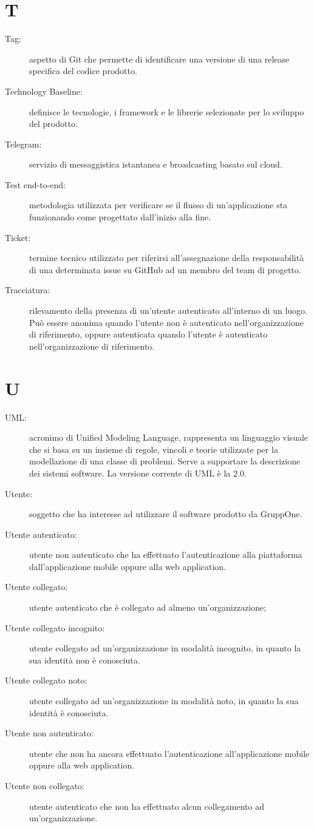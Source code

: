 \documentclass{article}
\begin{document}
\section{T}
\begin{description}
  \item[Tag:] aspetto di Git che permette di identificare una versione di una release specifica del codice prodotto.
  \item[Technology Baseline:] definisce le tecnologie, i framework e le librerie selezionate per lo sviluppo del prodotto.
  \item[Telegram:] servizio di messaggistica istantanea e broadcasting basato sul cloud.
  \item[Test end-to-end:] metodologia utilizzata per verificare se il flusso di un'applicazione sta funzionando come progettato dall'inizio alla fine.
  \item[Ticket:] termine tecnico utilizzato per riferirsi all'assegnazione della responsabilità di una determinata issue su GitHub ad un membro del team di progetto.
  \item[Tracciatura:] rilevamento della presenza di un'utente autenticato all'interno di un luogo. Può essere anonima quando l'utente non è autenticato nell'organizzazione di riferimento, oppure autenticata quando l'utente è autenticato nell'organizzazione di riferimento.
\end{description}
\newpage
\section{U}
\begin{description}
  \item[UML:] acronimo di Unified Modeling Language, rappresenta un linguaggio visuale che si basa su un insieme di regole, vincoli e teorie utilizzate per la modellazione di una classe di problemi. Serve a supportare la descrizione dei sistemi software. La versione corrente di UML è la 2.0.
  \item[Utente:] soggetto che ha interesse ad utilizzare il software prodotto da GruppOne.
  \item[Utente autenticato:] utente non autenticato che ha effettuato l'autenticazione alla piattaforma dall'applicazione mobile oppure alla web application.
  \item[Utente collegato:] utente autenticato che è collegato ad almeno un'organizzazione;
  \item[Utente collegato incognito:] utente collegato ad un'organizzazione in modalità incognito, in quanto la sua identità non è conosciuta.
  \item[Utente collegato noto:] utente collegato ad un'organizzazione in modalità noto, in quanto la sua identità è conosciuta.
  \item[Utente non autenticato:] utente che non ha ancora effettuato l'autenticazione all'applicazione mobile oppure alla web application.
  \item[Utente non collegato:] utente autenticato che non ha effettuato alcun collegamento ad un'organizzazione.
\end{description}
\newpage
\end{document}
